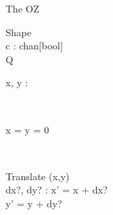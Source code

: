 The OZ
\begin{class}{Shape}
\\c : chan[bool]
\\Q{}
\\
\begin{state}
x, y : \real
\end{state} 
\\
\begin{init}
x = y = 0
\end{init} 
\\
\begin{op}{Translate}
\Delta (x,y)
\\
dx?, dy? : \real
\ST
x’ = x + dx?
\\y’ = y + dy?
\end{op}\end{class}
\newpage %
